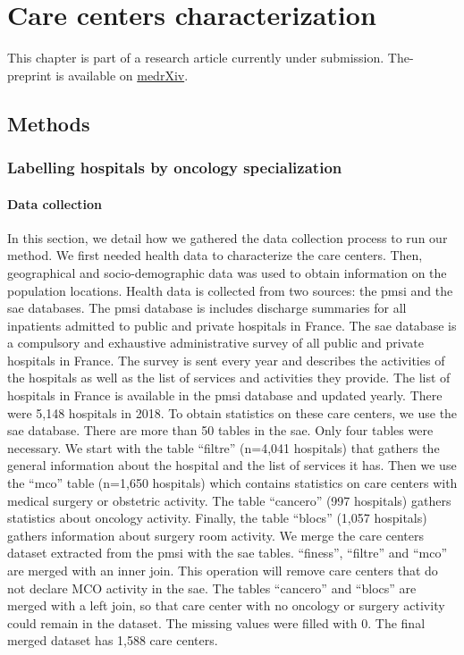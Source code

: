 \chapter{Care centers characterization}
\label{chapter:center-characterization}

This chapter is part of a research article currently under submission.
The-preprint is available on
\href{https://www.medrxiv.org/content/10.1101/2021.09.29.21264296v1.article-info}{medrXiv}.

\section{Methods}

\subsection{Labelling hospitals by oncology specialization}
\label{section:oncology-specialization-cluster}

\subsubsection{Data collection}

In this section, we detail how we gathered the data collection process to run
our method.  We first needed health data to characterize the care centers. Then,
geographical and socio-demographic data was used to obtain information on the
population locations. Health data is collected from two sources: the \ac{pmsi}
and the \ac{sae} databases. The \ac{pmsi} database is includes discharge
summaries for all inpatients admitted to public and private hospitals in France.
The \ac{sae} database is a compulsory and exhaustive administrative survey of
all public and private hospitals in France. The survey is sent every year and
describes the activities of the hospitals as well as the list of services and
activities they provide. The list of hospitals in France is available in the
\ac{pmsi} database and updated yearly. There were 5,148 hospitals in 2018. To
obtain statistics on these care centers, we use the \ac{sae} database. There are
more than 50 tables in the \ac{sae}. Only four tables were necessary. We start
with the table ``filtre'' (n=4,041 hospitals) that gathers the general
information about the hospital and the list of services it has. Then we use the
``mco'' table (n=1,650 hospitals) which contains statistics on care centers with
medical surgery or obstetric activity. The table ``cancero'' (997 hospitals)
gathers statistics about oncology activity. Finally, the table ``blocs'' (1,057
hospitals) gathers information about surgery room activity. We merge the care
centers dataset extracted from the \ac{pmsi} with the \ac{sae} tables.
``finess'', ``filtre'' and ``mco'' are merged with an inner join. This operation
will remove care centers that do not declare MCO activity in the \ac{sae}. The
tables ``cancero'' and ``blocs'' are merged with a left join, so that care
center with no oncology or surgery activity could remain in the dataset. The
missing values were filled with 0. The final merged dataset has 1,588 care
centers.


